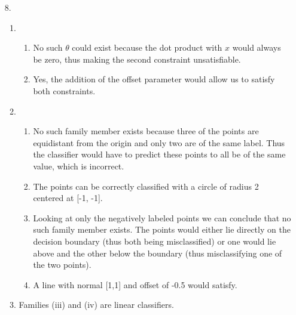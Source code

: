 \documentclass{article}
\begin{document}
\begin{enumerate}
\item[8.]
	\begin{enumerate}
	\item
		\begin{enumerate}
		\item No such $\theta$ could exist because the dot product with $x$ would always be zero, thus making the second constraint unsatisfiable.
		\item Yes, the addition of the offset parameter would allow us to satisfy both constraints.
		\end{enumerate}
	\item
		\begin{enumerate}
		\item 
			  No such family member exists because three of the points are equidistant from the origin and only two are of the same label. Thus the classifier would have to predict these points to all be of the same value, which is incorrect.
		\item 
			  The points can be correctly classified with a circle of radius 2 centered at [-1, -1].
		\item 
			  Looking at only the negatively labeled points we can conclude that no such family member exists. The points would either lie directly on the decision boundary (thus both being misclassified) or one would lie above and the other below the boundary (thus misclassifying one of the two points).
		\item 
			  A line with normal [1,1] and offset of -0.5 would satisfy.
		\end{enumerate}
	\item Families (iii) and (iv) are linear classifiers.
	\end{enumerate}

\bigskip


\end{enumerate}
\end{document}
